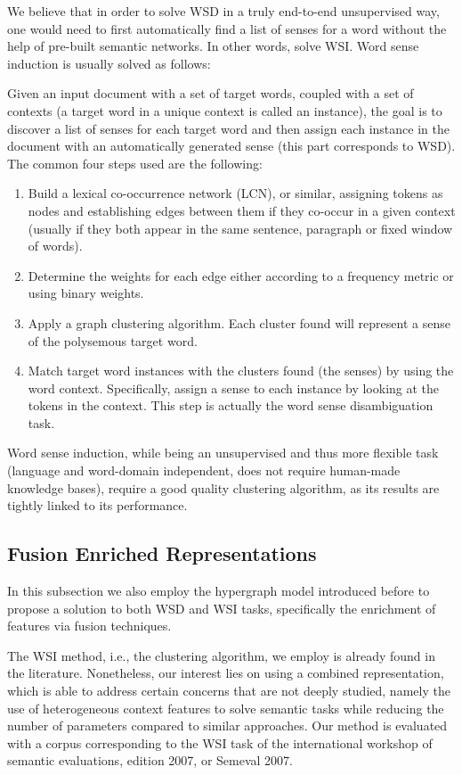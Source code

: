 We believe that in order to solve WSD in a truly end-to-end unsupervised way, one would need to first automatically find a list of senses for a word without the help of pre-built semantic networks. In other words, solve WSI. Word sense induction is usually solved as follows:

Given an input document with a set of target words, coupled with a set of contexts (a target word in a unique context is called an instance), the goal is to discover a list of senses for each target word and then assign each instance in the document with an automatically generated sense (this part corresponds to WSD). The common four steps used are the following:

\begin{enumerate}
\item Build a lexical co-occurrence network (LCN), or similar, assigning tokens as nodes and  establishing edges between them if they co-occur in a given context (usually if they both appear in the same sentence, paragraph or fixed window of words).
\item Determine the weights for each edge either according to a frequency metric or using binary weights. 
\item Apply a graph clustering algorithm. Each cluster found will represent a sense of the polysemous target word.
\item Match target word instances with the clusters found (the senses) by using the word context. Specifically, assign a sense to each instance by looking at the tokens in the context. This step is actually the word sense disambiguation task. 
\end{enumerate}	


Word sense induction, while being an unsupervised and thus more flexible task (language and word-domain independent, does not require human-made knowledge bases), require a good quality clustering algorithm, as its results are tightly linked to its performance.
\subsection{Fusion Enriched Representations}

In this subsection we also employ the hypergraph model introduced before to propose a solution to both WSD and WSI tasks, specifically the enrichment of features via fusion techniques.

The WSI method, i.e., the clustering algorithm, we employ is already found in the literature. Nonetheless, our interest lies on  using a combined representation, which is able to address certain concerns that are not deeply studied, namely the use of heterogeneous context features to solve semantic tasks while reducing the number of parameters compared to similar approaches.  Our method is evaluated with a corpus corresponding to the WSI task of the international workshop of semantic evaluations, edition 2007, or Semeval 2007. 


